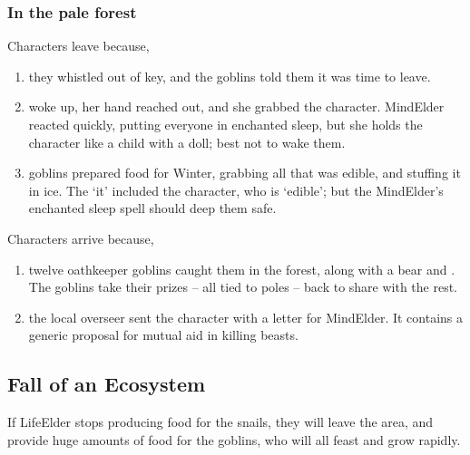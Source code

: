 \begin{multicols}{2}
\subsubsection{In the pale forest}

Characters leave because,

\begin{enumerate}
  \item
  they whistled out of key, and the goblins told them it was time to leave.
  \item
   woke up, her hand reached out, and she grabbed the character.
  \gls{MindElder} reacted quickly, putting everyone in enchanted sleep, but she holds the character like a child with a doll; best not to wake them.
  \item
  goblins prepared food for Winter, grabbing all that was edible, and stuffing it in ice.
  The `it' included the character, who is `edible'; but the \gls{MindElder}'s enchanted sleep spell should deep them safe.
\end{enumerate}

Characters arrive because,

\begin{enumerate}
  \item
  twelve oathkeeper goblins caught them in the forest, along with a bear and .
  The goblins take their prizes -- all tied to poles -- back to share with the rest.
  \item
  the local overseer sent the character with a letter for \gls{MindElder}.
  It contains a generic proposal for mutual aid in killing beasts.
\end{enumerate}

\subsection{Fall of an Ecosystem}

If \gls{LifeElder} stops producing food for the snails, they will leave the area, and provide huge amounts of food for the goblins, who will all feast and grow rapidly.


\end{multicols}

\printglossary[
  title={Factions},
  type=people,
  style=topicmcols,
  ]

